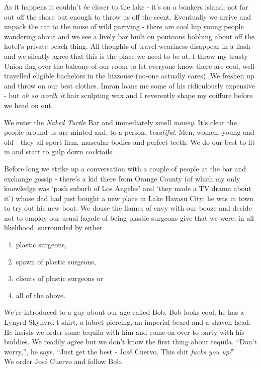 \documentclass[a5paper,titlepage,11pt,draft]{book}
\begin{document}
As it happens it couldn't \emph{be} closer to the lake - it's on a bonkers island, not far out off the shore but enough to throw us off the scent.  Eventually we arrive and unpack the car to the noise of wild partying - there are cool hip young people wandering about and we see a lively bar built on pontoons bobbing about off the hotel's private beach thing.  All thoughts of travel-weariness disappear in a flash and we silently agree that this is the place we need to be at.  I throw my trusty Union flag over the balcony of our room to let everyone know there are cool, well-travelled eligible bachelors in the hizzouse (no-one actually cares).  We freshen up and throw on our best clothes.  Imran loans me some of his ridiculously expensive - but \emph{oh so worth it} hair sculpting wax and I reverently shape my coiffure before we head on out.

We enter the \emph{Naked Turtle} Bar and immediately smell \emph{money}.  It's clear the people around us are minted and, to a person, \emph{beautiful}.  Men, women, young and old - they all sport firm, muscular bodies and perfect teeth.  We do our best to fit in and start to gulp down cocktails.

Before long we strike up a conversation with a couple of people at the bar and exchange gossip - there's a kid there from Orange County (of which my only knowledge was `posh suburb of Los Angeles' and `they made a TV drama about it') whose dad had just bought a new place in Lake Havasu City; he was in town to try out his new boat.  We douse the flames of envy with our booze and decide not to employ our usual fa\c{c}ade of being plastic surgeons give that we were, in all likelihood, surrounded by either
\begin{enumerate}
\item plastic surgeons,
\item spawn of plastic surgeons,
\item clients of plastic surgeons or
\item all of the above.
\end{enumerate}

We're introduced to a guy about our age called Bob.  Bob looks cool; he has a Lynyrd Skynyrd t-shirt, a labret piercing, an imperial beard and a shaven head.  He insists we order some tequila with him and come on over to party with his buddies.  We readily agree but we don't know the first thing about tequila.  ``Don't worry,'', he says.  ``Just get the best - Jos\'{e} Cuervo.  This shit \emph{fucks you up!}'' \\
We order Jos\'{e} Cuervo and follow Bob.
\end{document}
